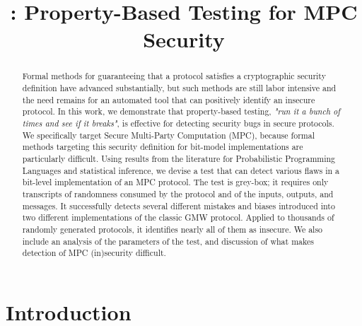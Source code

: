 \documentclass[compsoc, conference, a4paper, 10pt, times]{IEEEtran}
\title{\toolname: Property-Based Testing for MPC Security}
\begin{document}
\newtheorem{definition}{Definition}

\ExplSyntaxOn    %
\newcommand { \eg }
{ \textit{e.g.}
  \peek_meaning_ignore_spaces:NTF .
    { \skip_horizontal:n { -.3ex } \use_none:n }
    { \peek_meaning_ignore_spaces:NF , { \skip_horizontal:n { -.3ex } } }
}
\newcommand { \ie }
{ \textit{i.e.}
  \peek_meaning_ignore_spaces:NTF .
    { \skip_horizontal:n { -.3ex } \use_none:n }
    { \peek_meaning_ignore_spaces:NF , { \skip_horizontal:n { -.3ex } } }
}
\ExplSyntaxOff

\newcommand{\termOfArt}[1]{\textbf{#1}}


\maketitle
\thispagestyle{plain}
\pagestyle{plain}

\begin{abstract}
  Formal methods for guaranteeing that a protocol satisfies a cryptographic security definition have advanced substantially,
  but such methods are still labor intensive and the need remains for an automated tool that can positively identify an insecure protocol.
  In this work, we demonstrate that property-based testing, \textit{"run it a bunch of times and see if it breaks"},
  is effective for detecting security bugs in secure protocols.
  We specifically target Secure Multi-Party Computation (MPC), because formal methods targeting this security definition for bit-model implementations
  are particularly difficult.
  Using results from the literature for Probabilistic Programming Languages and statistical inference, we devise a test that can
  detect various flaws in a bit-level implementation of an MPC protocol.
  The test is grey-box; it requires only transcripts of randomness consumed by the protocol and of the inputs, outputs, and messages.
  It successfully detects several different mistakes and biases introduced into two different implementations of the classic GMW protocol.
  Applied to thousands of randomly generated protocols, it identifies nearly all of them as insecure.
  We also include an analysis of the parameters of the test, and discussion of what makes detection of MPC (in)security difficult.
\end{abstract}

\section{Introduction}
\end{document}
